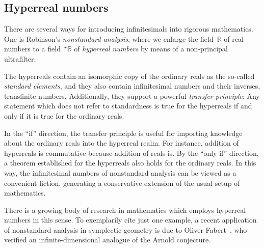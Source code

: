 \documentclass[oneside,reqno]{amsart}
\theoremstyle{definition}
\theoremstyle{plain}
\theoremstyle{remark}
\newcommand{\RR}{\mathbb{R}}
\renewcommand{\_}{\mathpunct{.}\,}
\newcommand{\?}{\,{:}\,}
\begin{document}
\subsection{Hyperreal numbers} There are several ways for introducing
infinitesimals into rigorous mathematics. One is Robinson's \emph{nonstandard
analysis}, where we enlarge the field~$\RR$ of real numbers to a
field~$^\star\RR$ of \emph{hyperreal numbers} by means of a non-principal
ultrafilter.

The hyperreals contain an isomorphic copy of the ordinary reals as the
so-called \emph{standard elements}, and they also contain infinitesimal numbers
and their inverses, transfinite numbers. Additionally, they support a powerful \emph{transfer
principle}: Any statement which does not refer to standardness is true for the
hyperreals if and only if it is true for the ordinary reals.

In the ``if'' direction, the transfer principle is useful for importing
knowledge about the ordinary reals into the hyperreal realm. For instance,
addition of hyperreals is commutative because addition of reals is.
By the ``only if'' direction, a theorem established for the hyperreals also
holds for the ordinary reals. In this way, the infinitesimal numbers of
nonstandard analysis can be viewed as a convenient fiction, generating a
conservative extension of the usual setup of mathematics.

There is a growing body of research in mathematics which employs hyperreal
numbers in this sense. To exemplarily cite just one example, a recent
application of nonstandard analysis in symplectic geometry is due to Oliver
Fabert~\cite{fabert:non-squeezing,fabert:floer}, who verified an
infinite-dimensional analogue of the Arnold conjecture.
\end{document}
